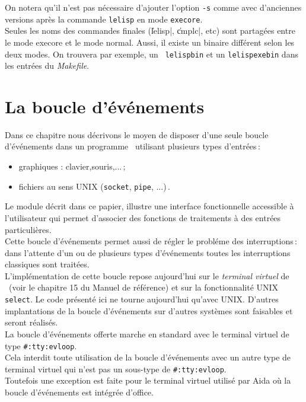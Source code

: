 On notera qu'il n'est pas n\'{e}cessaire d'ajouter l'option {\tt -s}
comme avec d'anciennes versions apr\`{e}s la commande {\tt lelisp} en
mode {\tt execore}. \\
Seules les noms des commandes finales (\|lelisp|, \|cmplc|, etc) sont
partag\'{e}es
entre le mode execore et le mode normal. Aussi, il existe un binaire
diff\'{e}rent selon les deux modes. On trouvera par exemple, un {\tt
lelispbin} et un {\tt lelispexebin} dans les entr\'{e}es du {\em Makefile}.

\chapter {La boucle d'\'{e}v\'{e}nements}

Dans ce chapitre nous d\'{e}crivons le moyen de disposer d'une seule boucle
d'\'{e}v\'{e}nements dans un programme \LeLisp\ utilisant plusieurs types
d'entr\'{e}es\,:\\
\begin {itemize}
\item graphiques : clavier,souris,...\,;
\item fichiers au sens UNIX ({\tt socket}, {\tt pipe}, ...)\,.
\end{itemize}
Le module d\'{e}crit dans ce papier, illustre une interface fonctionnelle
accessible \`{a} l'utilisateur qui permet d'associer des fonctions
de traitements \`{a} des entr\'{e}es particuli\`{e}res.\\
Cette boucle d'\'{e}v\'{e}nements permet aussi de r\'{e}gler le probl\'{e}me des
interruptions\,: dans l'attente d'un ou de plusieurs types d'\'{e}v\'{e}nements
toutes les interruptions classiques sont trait\'{e}es.\\
L'impl\'{e}mentation de cette boucle repose aujourd'hui sur le
 {\em terminal virtuel} de \LeLisp\ (voir le chapitre  15 du Manuel de 
r\'{e}f\'{e}rence) et sur la fonctionnalit\'{e} UNIX {\tt select}. Le code
pr\'{e}sent\'{e} ici ne tourne aujourd'hui qu'avec UNIX. D'autres
implantations de la boucle d'\'{e}v\'{e}nements sur d'autres syst\`{e}mes sont
faisables et seront r\'{e}alis\'{e}s.\\
La boucle d'\'{e}v\'{e}nements offerte marche en standard avec le terminal 
virtuel de type {\tt \#:tty:evloop}.\\
Cela interdit toute utilisation de la boucle d'\'{e}v\'{e}nements avec
un autre type de terminal virtuel qui n'est pas un sous-type de
{\tt \#:tty:evloop}.\\
Toutefois une exception est faite pour le terminal virtuel utilis\'{e} par
Aida o\`{u} la boucle d'\'{e}v\'{e}nements est int\'{e}gr\'{e}e d'office.\\

